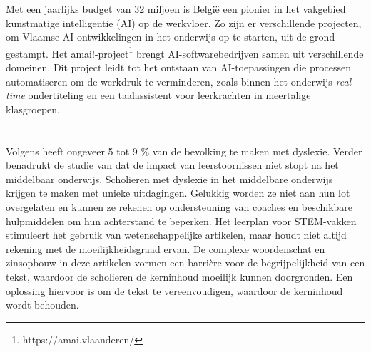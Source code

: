 \newline

Met een jaarlijks budget van 32 miljoen is België een pionier \autocite{Crevits2022} in het vakgebied kunstmatige intelligentie (AI) op de werkvloer.  Zo zijn er verschillende projecten, om Vlaamse AI-ontwikkelingen in het onderwijs op te starten, uit de grond gestampt. Het amai!-project\footnote{https://amai.vlaanderen/}  brengt AI-softwarebedrijven samen uit verschillende domeinen. Dit project leidt tot het ontstaan van AI-toepassingen die processen automatiseren om de werkdruk te verminderen, zoals binnen het onderwijs \textit{real-time} ondertiteling en een taalassistent voor leerkrachten in meertalige klasgroepen.

\section{}%
\label{sec:probleemstelling}



Volgens \textcite{Ghesquiere2018} heeft ongeveer 5 tot 9 \% van de bevolking te maken met dyslexie. Verder benadrukt de studie van \textcite{Lissens2020} dat de impact van leerstoornissen niet stopt na het middelbaar onderwijs. Scholieren met dyslexie in het middelbare onderwijs krijgen te maken met unieke uitdagingen. Gelukkig worden ze niet aan hun lot overgelaten en kunnen ze rekenen op ondersteuning van coaches en beschikbare hulpmiddelen om hun achterstand te beperken. Het leerplan voor STEM-vakken stimuleert het gebruik van wetenschappelijke artikelen, maar houdt niet altijd rekening met de moeilijkheidsgraad ervan. De complexe woordenschat en zinsopbouw in deze artikelen vormen een barrière voor de begrijpelijkheid van een tekst, waardoor de scholieren de kerninhoud moeilijk kunnen doorgronden. Een oplossing hiervoor is om de tekst te vereenvoudigen, waardoor de kerninhoud wordt behouden.

